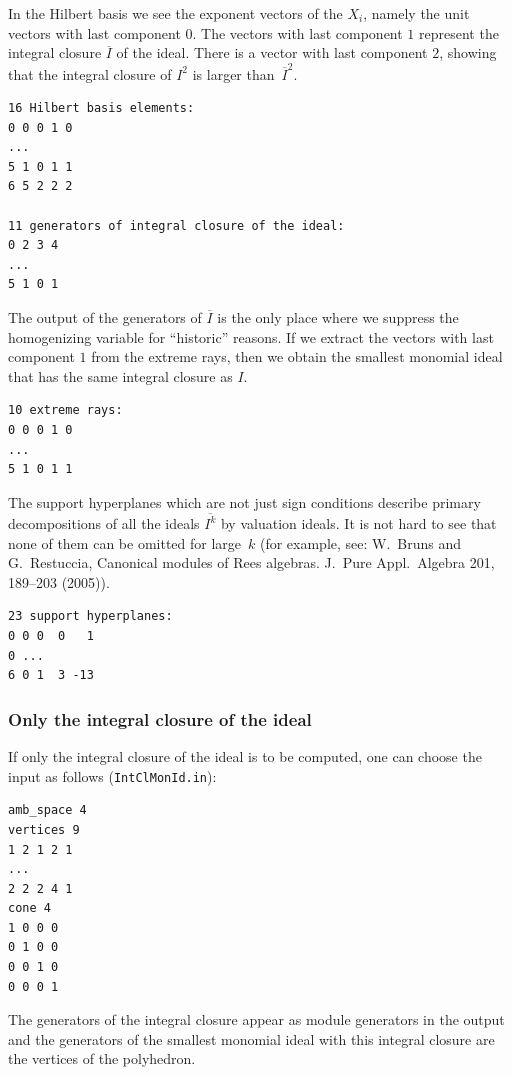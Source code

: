 In the Hilbert basis we see the exponent vectors of the $X_i$, namely the unit vectors with last component $0$. The vectors with last component $1$ represent the integral closure $\overline I$ of the ideal. There is a vector with last component $2$, showing that the integral closure of $I^2$ is larger than~$\overline I^2$.
\begin{Verbatim}
16 Hilbert basis elements:
0 0 0 1 0
...
5 1 0 1 1
6 5 2 2 2

11 generators of integral closure of the ideal:
0 2 3 4
...
5 1 0 1
\end{Verbatim}
The output of the generators of $\overline I$ is the only place where we suppress the homogenizing variable for ``historic'' reasons. If we extract the vectors with last component $1$ from the extreme rays, then we obtain the smallest monomial ideal that has the same integral closure as $I$.
\begin{Verbatim}
10 extreme rays:
0 0 0 1 0
...
5 1 0 1 1
\end{Verbatim}
The support hyperplanes which are not just sign conditions describe primary decompositions of all the ideals $\overline{I^k}$ by valuation ideals. It is not hard to see that none of them can be omitted for large~$k$ (for example, see: W.~Bruns and G.~Restuccia, Canonical modules of Rees algebras. J.\ Pure Appl.\ Algebra 201, 189--203 (2005)).
\begin{Verbatim}
23 support hyperplanes:
0 0 0  0   1
0 ...
6 0 1  3 -13
\end{Verbatim}

\subsubsection{Only the integral closure of the ideal}

If only the integral closure of the ideal is to be computed, one can choose the input as follows (\verb|IntClMonId.in|):
\begin{Verbatim}
amb_space 4
vertices 9
1 2 1 2 1
...
2 2 2 4 1
cone 4
1 0 0 0
0 1 0 0
0 0 1 0
0 0 0 1
\end{Verbatim}

The generators of the integral closure appear as module generators in the output and the generators of the smallest monomial ideal with this integral closure are the vertices of the polyhedron.



